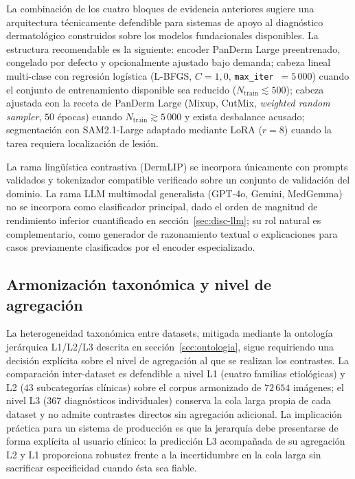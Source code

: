 La combinación de los cuatro bloques de evidencia anteriores
sugiere una arquitectura técnicamente defendible para sistemas de
apoyo al diagnóstico dermatológico construidos sobre los modelos
fundacionales disponibles. La estructura recomendable es la
siguiente: encoder PanDerm Large preentrenado, congelado por
defecto y opcionalmente ajustado bajo demanda; cabeza lineal
multi-clase con regresión logística (L-BFGS, $C=1{,}0$,
\texttt{max\_iter}~$=5\,000$) cuando el conjunto de entrenamiento
disponible sea reducido ($N_{\mathrm{train}} \lesssim 500$);
cabeza ajustada con la receta de PanDerm Large
(Mixup, CutMix, \emph{weighted random sampler}, $50$ épocas)
cuando $N_{\mathrm{train}} \gtrsim 5\,000$ y exista desbalance
acusado; segmentación con SAM2.1-Large adaptado mediante LoRA
($r = 8$) cuando la tarea requiera localización de lesión.

La rama lingüística contrastiva (DermLIP) se incorpora únicamente
con prompts validados y tokenizador compatible verificado sobre un
conjunto de validación del dominio. La rama LLM multimodal
generalista (GPT-4o, Gemini, MedGemma) no se incorpora como
clasificador principal, dado el orden de magnitud de rendimiento
inferior cuantificado en secci\'on~\ref{sec:disc-llm}; su rol natural es
complementario, como generador de razonamiento textual o
explicaciones para casos previamente clasificados por el encoder
especializado.

\subsection{Armonización taxonómica y nivel de agregación}
\label{sec:disc-armonizacion}

La heterogeneidad taxonómica entre datasets, mitigada mediante la
ontología jerárquica L1/L2/L3 descrita en secci\'on~\ref{sec:ontologia},
sigue requiriendo una decisión explícita sobre el nivel de
agregación al que se realizan los contrastes. La comparación
inter-dataset es defendible a nivel L1 (cuatro familias
etiológicas) y L2 ($43$ subcategorías clínicas) sobre el corpus
armonizado de $72\,654$ imágenes; el nivel L3 ($367$
diagnósticos individuales) conserva la cola larga propia de cada
dataset y no admite contrastes directos sin agregación
adicional. La implicación práctica para un sistema de producción es
que la jerarquía debe presentarse de forma explícita al usuario
clínico: la predicción L3 acompañada de su agregación L2 y L1
proporciona robustez frente a la incertidumbre en la cola larga sin
sacrificar especificidad cuando ésta sea fiable.

